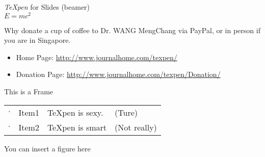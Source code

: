 \documentclass[12pt]{beamer}
\begin{document}


\begin{frame}
\begin{center}
{\Large \textit{{\TeX}pen} for Slides (beamer) }\\
$E=mc^{2}$

\end{center}

\vspace{1cm}
\scriptsize
Why donate a cup of coffee to Dr. WANG MengChang via PayPal, or in person if you are in Singapore.

\begin {itemize}
\item Home Page: {\href{http://www.journalhome.com/texpen/}{http://www.journalhome.com/texpen/}}
\item Donation Page: {\href{http://www.journalhome.com/texpen/Donation/}{http://www.journalhome.com/texpen/Donation/}}
\end{itemize}




\end{frame}




\begin{frame}{This is a Frame}
\begin{center}
\scriptsize
\begin{tabular}{clll}
$\cdot$ & Item1    & {\TeX}pen is sexy.             & (Ture) \\
$\cdot$ & Item2    & {\TeX}pen is smart 	   & (Not really) \\
\end{tabular}
\end{center}

\begin{center}
You can insert a figure here
  \usetikzlibrary{mindmap}
    
\end{center}
\end{frame}
\end{document}
